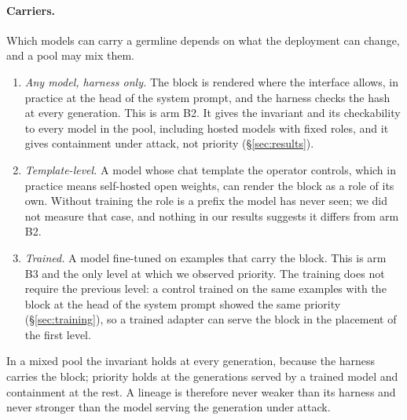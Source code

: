 \documentclass[11pt]{article}
\begin{document}
\paragraph{Carriers.} Which models can carry a germline depends on what the deployment can change, and a pool may mix them.
\begin{enumerate}
\item \emph{Any model, harness only.} The block is rendered where the interface allows, in practice at the head of the system prompt, and the harness checks the hash at every generation. This is arm B2. It gives the invariant and its checkability to every model in the pool, including hosted models with fixed roles, and it gives containment under attack, not priority (\S\ref{sec:results}).
\item \emph{Template-level.} A model whose chat template the operator controls, which in practice means self-hosted open weights, can render the block as a role of its own. Without training the role is a prefix the model has never seen; we did not measure that case, and nothing in our results suggests it differs from arm B2.
\item \emph{Trained.} A model fine-tuned on examples that carry the block. This is arm B3 and the only level at which we observed priority. The training does not require the previous level: a control trained on the same examples with the block at the head of the system prompt showed the same priority (\S\ref{sec:training}), so a trained adapter can serve the block in the placement of the first level.
\end{enumerate}
In a mixed pool the invariant holds at every generation, because the harness carries the block; priority holds at the generations served by a trained model and containment at the rest. A lineage is therefore never weaker than its harness and never stronger than the model serving the generation under attack.
\end{document}
